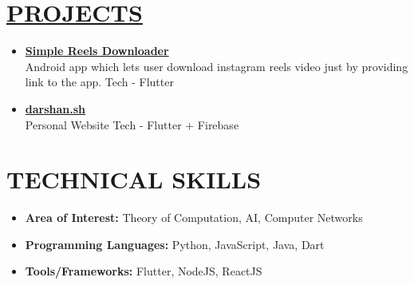 \documentclass[line, margin, 12pt]{res}
\begin{document}
\begin{resume}
\section{\hyperref[https://www.github.com/darshansharma]{PROJECTS}}
\begin{itemize}
\item \textbf{\href{https://play.google.com/store/apps/details?id=com.darshansharma.simple_reels_downloader}{Simple Reels Downloader}}\\
Android app which lets user download instagram reels video just by providing link to the app.
Tech - Flutter
\item \textbf{\href{https://darshan.sh}{darshan.sh}}\\
Personal Website
Tech - Flutter + Firebase
\end{itemize}

\section{TECHNICAL SKILLS}
\begin{itemize}
\item \textbf{Area of Interest:} Theory of Computation, AI, Computer Networks
\item \textbf{Programming Languages:}  Python, JavaScript, Java, Dart
\item \textbf{Tools/Frameworks:} Flutter,  NodeJS, ReactJS \\
\end{itemize}

\end{resume}
\end{document}
